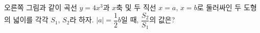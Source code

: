 \noindent\begin{minipage}[t]{0.58\linewidth}\vspace{0pt}\raggedright 오른쪽 그림과 같이 곡선 $y=4x^3$과 $x$축 및 두 직선 $x=a$, $x=b$로 둘러싸인 두 도형의 넓이를 각각 $S_1$, $S_2$라 하자. $|a|=\dfrac{1}{2}b$일 때, $\dfrac{S_2}{S_1}$의 값은? \end{minipage}\hfill\begin{minipage}[t]{0.4\linewidth}\vspace{0pt}\centering \resizebox{\ifdim\width>\linewidth\linewidth\else\width\fi}{!}{}\end{minipage}\par
{}
